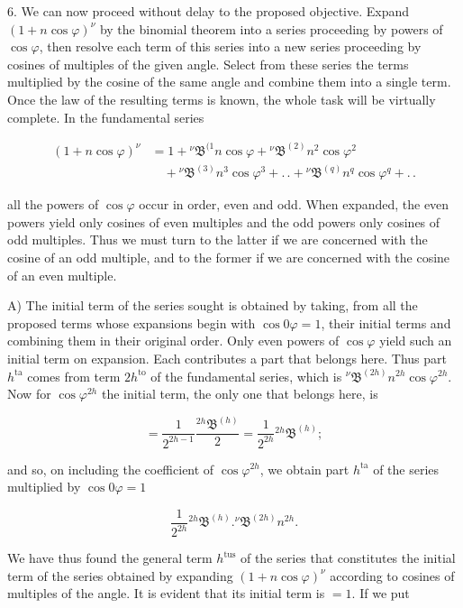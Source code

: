 \par\noindent{}%
\hspace*{\parindent}6. We can now proceed without delay to the proposed objective. Expand $(1+n\cos\varphi)^{\nu}$ by the binomial theorem into a series proceeding by powers of $\cos\varphi$, then resolve each term of this series into a new series proceeding by cosines of multiples of the given angle. Select from these series the terms multiplied by the cosine of the same angle and combine them into a single term. Once the law of the resulting terms is known, the whole task will be virtually complete. In the fundamental series

\[
\begin{aligned}
(1+n\cos\varphi)^{\nu} & = 1 + {}^{\nu}\mathfrak{B}^{(1} n\cos\varphi + {}^{\nu}\mathfrak{B}^{(2)} n^{2}\cos\varphi^{2} \\&\quad + {}^{\nu}\mathfrak{B}^{(3)} n^{3}\cos\varphi^{3} + .\,. + {}^{\nu}\mathfrak{B}^{(q)} n^{q}\cos\varphi^{q} + .\,.
\end{aligned}
\]

\noindent all the powers of $\cos\varphi$ occur in order, even and odd. When expanded, the even powers yield only cosines of even multiples and the odd powers only cosines of odd multiples. Thus we must turn to the latter if we are concerned with the cosine of an odd multiple, and to the former if we are concerned with the cosine of an even multiple.

A) The initial term of the series sought is obtained by taking, from all the proposed terms whose expansions begin with $\cos 0\varphi = 1$, their initial terms and combining them in their original order. Only even powers of $\cos\varphi$ yield such an initial term on expansion. Each contributes a part that belongs here. Thus part $h^{\text{ta}}$ comes from term $2h^{\text{to}}$ of the fundamental series, which is ${}^{\nu}\mathfrak{B}^{(2h)} n^{2h}\cos\varphi^{2h}$. Now for $\cos\varphi^{2h}$ the initial term, the only one that belongs here, is

\[
= \frac{1}{2^{2h-1}} \frac{{}^{2h}\mathfrak{B}^{(h)}}{2} = \frac{1}{2^{2h}} {}^{2h}\mathfrak{B}^{(h)};
\]

\noindent and so, on including the coefficient of $\cos\varphi^{2h}$, we obtain part $h^{\text{ta}}$ of the series multiplied by $\cos 0\varphi = 1$

\[
\frac{1}{2^{2h}} {}^{2h}\mathfrak{B}^{(h)}  .  {}^{\nu}\mathfrak{B}^{(2h)} n^{2h}.
\]

\noindent We have thus found the general term $h^{\text{tus}}$ of the series that constitutes the initial term of the series obtained by expanding $(1+n\cos\varphi)^{\nu}$ according to cosines of multiples of the angle. It is evident that its initial term is $=1$. If we put

